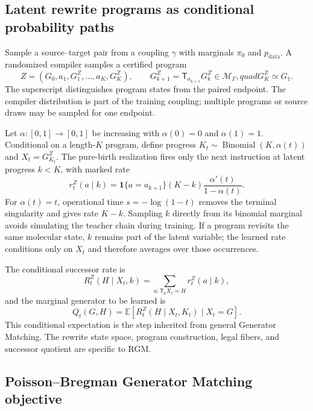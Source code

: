 \documentclass{article}
\newcommand{\rgm}{\textsc{RGM}\xspace}
\newcommand{\M}{\mathcal{M}_{\Gamma}}
\newcommand{\pdata}{p_{\mathrm{data}}}
\newcommand{\pzero}{\pi_0}
\newcommand{\T}{\mathsf{T}}
\newcommand{\E}{\mathbb{E}}
\newcommand{\one}{\mathbf{1}}
\theoremstyle{definition}
\theoremstyle{remark}
\begin{document}
\subsection{Latent rewrite programs as conditional probability paths}

Sample a source--target pair from a coupling $\gamma$ with marginals $\pzero$ and $\pdata$. A randomized compiler samples a certified program
\begin{equation}
Z=(G_0,a_1,G_1^Z,\ldots,a_K,G_K^Z),\qquad
G_{k+1}^Z=\T_{a_{k+1}}G_k^Z\in\M,quad G_K^Z\simeq G_1.
\label{eq:program}
\end{equation}
The superscript distinguishes program states from the paired endpoint. The compiler distribution is part of the training coupling; multiple programs or source draws may be sampled for one endpoint.

Let $\alpha:[0,1]\to[0,1]$ be increasing with $\alpha(0)=0$ and $\alpha(1)=1$. Conditional on a length-$K$ program, define progress $K_t\sim\operatorname{Binomial}(K,\alpha(t))$ and $X_t=G_{K_t}^Z$. The pure-birth realization fires only the next instruction at latent progress $k<K$, with marked rate
\begin{equation}
r_t^Z(a\mid k)=
\one\{a=a_{k+1}\}(K-k)\frac{\alpha'(t)}{1-\alpha(t)}.
\label{eq:conditional-rate}
\end{equation}
For $\alpha(t)=t$, operational time $s=-\log(1-t)$ removes the terminal singularity and gives rate $K-k$. Sampling $k$ directly from its binomial marginal avoids simulating the teacher chain during training. If a program revisits the same molecular state, $k$ remains part of the latent variable; the learned rate conditions only on $X_t$ and therefore averages over those occurrences.

The conditional successor rate is
\begin{equation}
R_t^Z(H\mid X_t,k)=\sum_{a:\T_aX_t\simeq H}r_t^Z(a\mid k),
\end{equation}
and the marginal generator to be learned is
\begin{equation}
Q_t(G,H)=\E\!\left[R_t^Z(H\mid X_t,K_t)\mid X_t=G\right].
\label{eq:marginal-generator}
\end{equation}
This conditional expectation is the step inherited from general Generator Matching. The rewrite state space, program construction, legal fibers, and successor quotient are specific to \rgm.

\subsection{Poisson--Bregman Generator Matching objective}
\end{document}
